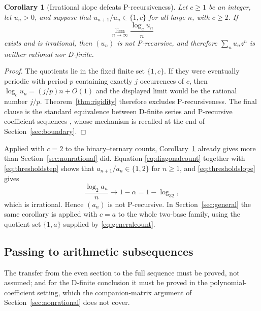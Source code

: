 \documentclass[11pt,letterpaper]{article}
\numberwithin{equation}{section}
\newtheorem{corollary}[theorem]{Corollary}
\theoremstyle{definition}
\theoremstyle{remark}
\begin{document}
\begin{corollary}[Irrational slope defeats P-recursiveness]\label{cor:slope}
Let $c\ge1$ be an integer, let $u_n>0$, and suppose that
$u_{n+1}/u_n\in\{1,c\}$ for all large $n$, with $c\ge2$. If
\[
 \lim_{n\to\infty}\frac{\log_cu_n}{n}
\]
exists and is irrational, then $(u_n)$ is not P-recursive, and therefore
$\sum_nu_nz^n$ is neither rational nor D-finite.
\end{corollary}
\begin{proof}
The quotients lie in the fixed finite set $\{1,c\}$. If they were eventually
periodic with period $p$ containing exactly $j$ occurrences of $c$, then
$\log_cu_n=(j/p)n+O(1)$ and the displayed limit would be the rational number
$j/p$. Theorem~\ref{thm:rigidity} therefore excludes P-recursiveness.
The final clause is the standard equivalence between D-finite series and
P-recursive coefficient sequences \cite[Theorem~1.5]{StanleyDFinite},
whose mechanism is recalled at the end of Section~\ref{sec:boundary}.
\end{proof}

Applied with $c=2$ to the binary--ternary counts, Corollary~\ref{cor:slope}
already gives more than Section~\ref{sec:nonrational} did. Equation
\eqref{eq:diagonalcount} together with \eqref{eq:thresholdstep} shows that
$a_{n+1}/a_n\in\{1,2\}$ for $n\ge1$, and \eqref{eq:thresholdslope} gives
\[
 \frac{\log_2a_n}{n}\longrightarrow1-\alpha=1-\log_32,
\]
which is irrational. Hence $(a_n)$ is not P-recursive. In
Section~\ref{sec:general} the same corollary is applied with $c=a$ to the
whole two-base family, using the quotient set $\{1,a\}$ supplied by
\eqref{eq:generalcount}.

\subsection{Passing to arithmetic subsequences}
The transfer from the even section to the full sequence must be proved, not
assumed; and for the D-finite conclusion it must be proved in the
polynomial-coefficient setting, which the companion-matrix argument of
Section~\ref{sec:nonrational} does not cover.
\end{document}
